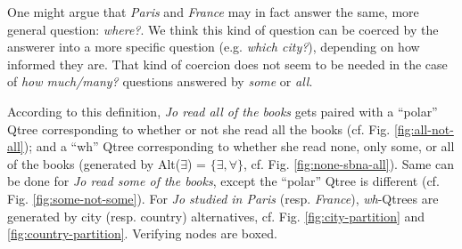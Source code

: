 	One might argue that \textit{Paris} and \textit{France} may in fact answer the same, more general question: \textit{where?}. We think this kind of question can be coerced by the answerer into a more specific question (e.g. \textit{which city?}), depending on how informed they are. That kind of coercion does not seem to be needed in the case of \textit{how much/many?} questions answered by \textit{some} or \textit{all}.
	
		
	
	
	\iffalse
	. They can also be seen as belonging to different tiers,\textit{some} being less granular than \textit{all}.
	; and whose (potential) intermediate layers corresponds to the Hamblin partition of the CS generated by $q$ (an alternative to $p$ entailed by $p$) and same-granularity alternatives to $q$. Such tiered Qtrees can be interpreted as a stack of \textit{wh}-questions answered by $p$, and whose specificity increases from top to bottom.
	\begin{minipage}{.26\linewidth}
		\centering
		\begin{figure}[H]
			\centering
			\scalebox{.8}{
				\begin{forest}
					[CS[$\neg\exists$][$\exists$[\sbna][\ofbox{$\forall$}]]]
			\end{forest}}
			\caption{``Wh'' Qtree for \textit{Jo read \textit{\textcolor{orange}{all}} of the books}.}\label{fig:all-not-all-some-not-some}
		\end{figure}
	\end{minipage}\hfill
	\hfill
	\scalebox{.8}{
		\begin{forest}
			for tree={s sep=2mm, inner sep=0, l=0}
			[CS[FR[\ofbox{Paris}][Nice][...]][UK[London][...]][...]]
	\end{forest}}
	\fi
	
	According to this definition, \textit{Jo read all of the books} gets paired with a ``polar'' Qtree corresponding to whether or not she read all the books (cf. Fig. \ref{fig:all-not-all}); and a ``wh'' Qtree corresponding to whether she read none, only some, or all of the books (generated by Alt($\exists$) = $\lbrace \exists, \forall\rbrace$, cf. Fig. \ref{fig:none-sbna-all}). Same can be done for \textit{Jo read some of the books}, except the ``polar'' Qtree is different (cf. Fig. \ref{fig:some-not-some}). For \textit{Jo studied in Paris} (resp. \textit{France}), \textit{wh}-Qtrees are generated by city (resp. country) alternatives, cf. Fig. \ref{fig:city-partition} and \ref{fig:country-partition}. Verifying nodes are boxed.
	

